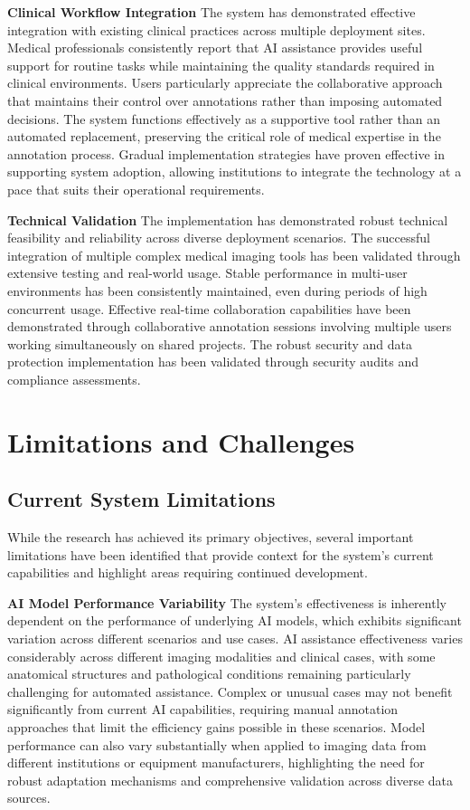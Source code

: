 \textbf{Clinical Workflow Integration}
The system has demonstrated effective integration with existing clinical practices across multiple deployment sites. Medical professionals consistently report that AI assistance provides useful support for routine tasks while maintaining the quality standards required in clinical environments. Users particularly appreciate the collaborative approach that maintains their control over annotations rather than imposing automated decisions. The system functions effectively as a supportive tool rather than an automated replacement, preserving the critical role of medical expertise in the annotation process. Gradual implementation strategies have proven effective in supporting system adoption, allowing institutions to integrate the technology at a pace that suits their operational requirements.

\textbf{Technical Validation}
The implementation has demonstrated robust technical feasibility and reliability across diverse deployment scenarios. The successful integration of multiple complex medical imaging tools has been validated through extensive testing and real-world usage. Stable performance in multi-user environments has been consistently maintained, even during periods of high concurrent usage. Effective real-time collaboration capabilities have been demonstrated through collaborative annotation sessions involving multiple users working simultaneously on shared projects. The robust security and data protection implementation has been validated through security audits and compliance assessments.

\section{Limitations and Challenges}

\subsection{Current System Limitations}

While the research has achieved its primary objectives, several important limitations have been identified that provide context for the system's current capabilities and highlight areas requiring continued development.

\textbf{AI Model Performance Variability}
The system's effectiveness is inherently dependent on the performance of underlying AI models, which exhibits significant variation across different scenarios and use cases. AI assistance effectiveness varies considerably across different imaging modalities and clinical cases, with some anatomical structures and pathological conditions remaining particularly challenging for automated assistance. Complex or unusual cases may not benefit significantly from current AI capabilities, requiring manual annotation approaches that limit the efficiency gains possible in these scenarios. Model performance can also vary substantially when applied to imaging data from different institutions or equipment manufacturers, highlighting the need for robust adaptation mechanisms and comprehensive validation across diverse data sources.

